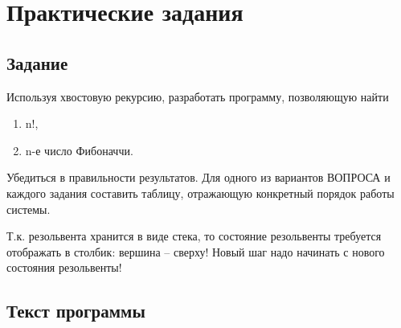 \chapter{Практические задания}

\section{Задание}

Используя хвостовую рекурсию, разработать программу, позволяющую найти
\begin{enumerate}[label=\arabic*)]
    \item n!,
    \item n-е число Фибоначчи.
\end{enumerate}

Убедиться в правильности результатов.  Для одного из вариантов ВОПРОСА и каждого
задания составить таблицу, отражающую конкретный порядок работы системы.

Т.к.  резольвента хранится в виде стека, то состояние резольвенты требуется
отображать в столбик: вершина – сверху! Новый шаг надо начинать с нового
состояния резольвенты!

\section{Текст программы}


